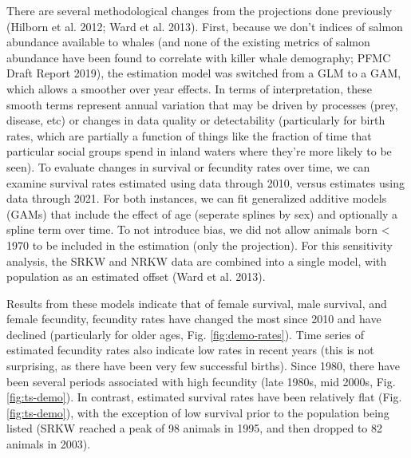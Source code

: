 \documentclass[]{article}
\begin{document}
There are several methodological changes from the projections done
previously (Hilborn et al. 2012; Ward et al. 2013). First, because we
don't indices of salmon abundance available to whales (and none of the
existing metrics of salmon abundance have been found to correlate with
killer whale demography; PFMC Draft Report 2019), the estimation model
was switched from a GLM to a GAM, which allows a smoother over year
effects. In terms of interpretation, these smooth terms represent annual
variation that may be driven by processes (prey, disease, etc) or
changes in data quality or detectability (particularly for birth rates,
which are partially a function of things like the fraction of time that
particular social groups spend in inland waters where they're more
likely to be seen). To evaluate changes in survival or fecundity rates
over time, we can examine survival rates estimated using data through
2010, versus estimates using data through 2021. For both instances, we
can fit generalized additive models (GAMs) that include the effect of
age (seperate splines by sex) and optionally a spline term over time. To
not introduce bias, we did not allow animals born \textless{} 1970 to be
included in the estimation (only the projection). For this sensitivity
analysis, the SRKW and NRKW data are combined into a single model, with
population as an estimated offset (Ward et al. 2013).

Results from these models indicate that of female survival, male
survival, and female fecundity, fecundity rates have changed the most
since 2010 and have declined (particularly for older ages, Fig.
\ref{fig:demo-rates}). Time series of estimated fecundity rates also
indicate low rates in recent years (this is not surprising, as there
have been very few successful births). Since 1980, there have been
several periods associated with high fecundity (late 1980s, mid 2000s,
Fig. \ref{fig:ts-demo}). In contrast, estimated survival rates have been
relatively flat (Fig. \ref{fig:ts-demo}), with the exception of low
survival prior to the population being listed (SRKW reached a peak of 98
animals in 1995, and then dropped to 82 animals in 2003).
\end{document}
